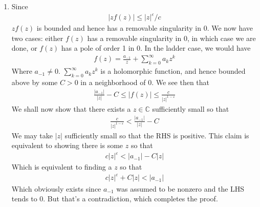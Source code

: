 \documentclass[12pt]{article}
\theoremstyle{definitionstyle}
\def\mbb#1{\mathbb{#1}}
\def \C{\mbb{C}}
\def \ve{\varepsilon}
\begin{document}
\begin{enumerate}[leftmargin=\labelsep]
		\item Since
		\begin{align*}
			|zf(z)| \leq |z|^{\ve} / c
		\end{align*}
		$zf(z)$ is bounded and hence has a removable singularity in 0. We now have two cases: either $f(z)$ has a removable singularity in 0, in which case we are done, or $f(z)$ has a pole of order 1 in 0. In the ladder case, we would have
		\begin{align*}
			f(z) = \frac{a_{-1}}{z} + \sum_{k=0}^\infty a_kz^k
		\end{align*}
		Where $a_{-1} \neq 0$. $\sum_{k=0}^\infty a_kz^k$ is a holomorphic function, and hence bounded above by some $C > 0$ in a neighborhood of 0. We see then that
		\begin{align*}
			\frac{|a_{-1}|}{|z|} - C \leq |f(z)| \leq \frac{c}{|z|^{1-\ve}}
		\end{align*}
		We shall now show that there exists a $z \in \C$ sufficiently small so that 
		\begin{align*}
			\frac{c}{|z|^{1-\ve}} < \frac{|a_{-1}|}{|z|} - C
		\end{align*}
		We may take $|z|$ sufficiently small so that the RHS is positive. This claim is equivalent to showing there is some $z$ so that 
		\begin{align*}
			c|z|^\ve < |a_{-1}| - C|z|
		\end{align*}
		Which is equivalent to finding a $z$ so that
		\begin{align*}
			c|z|^\ve + C|z| < |a_{-1}|
		\end{align*}
		Which obviously exists since $a_{-1}$ was assumed to be nonzero and the LHS tends to 0. But that's a contradiction, which completes the proof.
	\end{enumerate}
\end{document}
